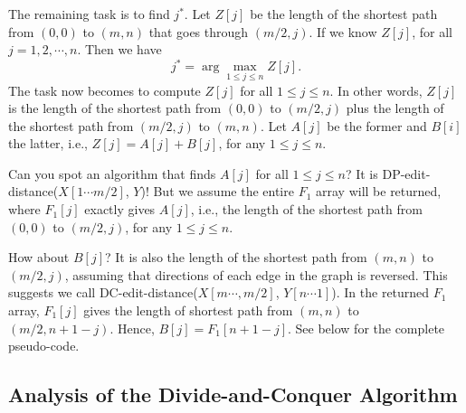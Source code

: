 \begin{algorithmblock}[0.8\textwidth]
	\xxx
	\xxx
	\xxx
	\xxx
	\xxx
	\xxx
\end{algorithmblock}


The remaining task is to find $j^*$.
Let $Z[j]$ be the length of the shortest path from $(0, 0)$ to $(m,n)$ that goes through $(m/2,j)$.
If we know $Z[j]$, for all $j = 1, 2, \cdots, n$. Then we have 
$$j^* = \arg\max_{1\le j \le n} Z[j].$$
The task now becomes to compute $Z[j]$ for all $1\le j \le n$.
In other words, $Z[j]$ is the length of the shortest path from $(0, 0)$ to $(m/2, j)$ plus
the length of the shortest path from $(m/2, j)$ to $(m,n)$.
Let $A[j]$ be the former and $B[i]$ the latter, i.e., $Z[j] = A[j] + B[j]$, for any $1\le j \le n$.

Can you spot an algorithm that finds $A[j]$ for all $1\le j \le n$?
It is DP-edit-distance($X[1\cdots m/2]$, $Y$)!
But we assume the entire $F_1$ array will be returned, where
$F_1[j]$ exactly gives $A[j]$, i.e., the length of the shortest path from $(0,0)$ to $(m/2, j)$, for any $1\le j \le n$.

How about $B[j]$? It is also the length of the shortest path from $(m, n)$ to $(m/2, j)$, assuming that
directions of each edge in the graph is reversed. This suggests we call DC-edit-distance($X[m\cdots, m/2]$, $Y[n\cdots 1]$).
In the returned $F_1$ array, $F_1[j]$ gives the length of shortest path from $(m,n)$ to $(m/2, n+1-j)$.
Hence, $B[j] = F_1[n+1-j]$. See below for the complete pseudo-code.

\begin{algorithmblock}[0.8\textwidth]
	\xxx
	\xxx
	\xxx
	\xxx
	\xxx
	\xxx
\end{algorithmblock}


\subsection*{Analysis of the Divide-and-Conquer Algorithm}

